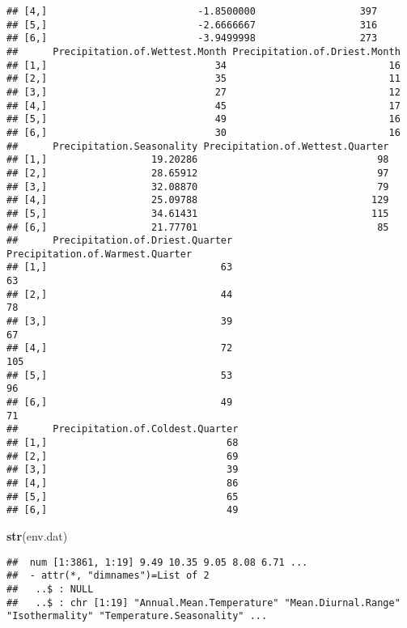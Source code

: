 \documentclass[]{article}
\newenvironment{Shaded}{\begin{snugshade}}{\end{snugshade}}
\newcommand{\KeywordTok}[1]{\textcolor[rgb]{0.13,0.29,0.53}{\textbf{#1}}}
\newcommand{\NormalTok}[1]{#1}
\begin{document}
\begin{verbatim}
## [4,]                          -1.8500000                  397
## [5,]                          -2.6666667                  316
## [6,]                          -3.9499998                  273
##      Precipitation.of.Wettest.Month Precipitation.of.Driest.Month
## [1,]                             34                            16
## [2,]                             35                            11
## [3,]                             27                            12
## [4,]                             45                            17
## [5,]                             49                            16
## [6,]                             30                            16
##      Precipitation.Seasonality Precipitation.of.Wettest.Quarter
## [1,]                  19.20286                               98
## [2,]                  28.65912                               97
## [3,]                  32.08870                               79
## [4,]                  25.09788                              129
## [5,]                  34.61431                              115
## [6,]                  21.77701                               85
##      Precipitation.of.Driest.Quarter Precipitation.of.Warmest.Quarter
## [1,]                              63                               63
## [2,]                              44                               78
## [3,]                              39                               67
## [4,]                              72                              105
## [5,]                              53                               96
## [6,]                              49                               71
##      Precipitation.of.Coldest.Quarter
## [1,]                               68
## [2,]                               69
## [3,]                               39
## [4,]                               86
## [5,]                               65
## [6,]                               49
\end{verbatim}

\begin{Shaded}
\begin{Highlighting}[]
\KeywordTok{str}\NormalTok{(env.dat)}
\end{Highlighting}
\end{Shaded}

\begin{verbatim}
##  num [1:3861, 1:19] 9.49 10.35 9.05 8.08 6.71 ...
##  - attr(*, "dimnames")=List of 2
##   ..$ : NULL
##   ..$ : chr [1:19] "Annual.Mean.Temperature" "Mean.Diurnal.Range" "Isothermality" "Temperature.Seasonality" ...
\end{verbatim}
\end{document}
